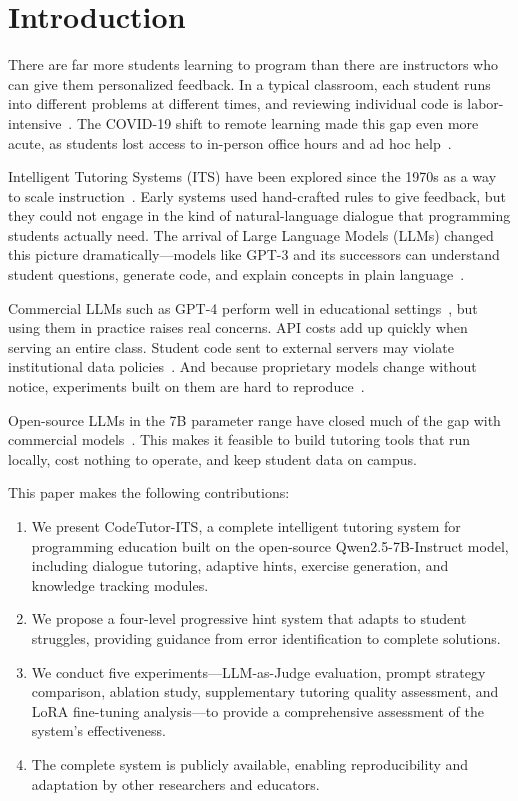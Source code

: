 \documentclass[applsci,article,submit,pdftex,moreauthors]{Definitions/mdpi}
\begin{document}
\section{Introduction}

There are far more students learning to program than there are instructors who can give them personalized feedback. In a typical classroom, each student runs into different problems at different times, and reviewing individual code is labor-intensive~\cite{ref1}. The COVID-19 shift to remote learning made this gap even more acute, as students lost access to in-person office hours and ad hoc help~\cite{ref2}.

Intelligent Tutoring Systems (ITS) have been explored since the 1970s as a way to scale instruction~\cite{ref3}. Early systems used hand-crafted rules to give feedback, but they could not engage in the kind of natural-language dialogue that programming students actually need. The arrival of Large Language Models (LLMs) changed this picture dramatically---models like GPT-3 and its successors can understand student questions, generate code, and explain concepts in plain language~\cite{ref4}.

Commercial LLMs such as GPT-4 perform well in educational settings~\cite{ref5}, but using them in practice raises real concerns. API costs add up quickly when serving an entire class. Student code sent to external servers may violate institutional data policies~\cite{ref6}. And because proprietary models change without notice, experiments built on them are hard to reproduce~\cite{ref7}.

Open-source LLMs in the 7B parameter range have closed much of the gap with commercial models~\cite{ref8}. This makes it feasible to build tutoring tools that run locally, cost nothing to operate, and keep student data on campus.

This paper makes the following contributions:
\begin{enumerate}
\item We present CodeTutor-ITS, a complete intelligent tutoring system for programming education built on the open-source Qwen2.5-7B-Instruct model, including dialogue tutoring, adaptive hints, exercise generation, and knowledge tracking modules.
\item We propose a four-level progressive hint system that adapts to student struggles, providing guidance from error identification to complete solutions.
\item We conduct five experiments---LLM-as-Judge evaluation, prompt strategy comparison, ablation study, supplementary tutoring quality assessment, and LoRA fine-tuning analysis---to provide a comprehensive assessment of the system's effectiveness.
\item The complete system is publicly available, enabling reproducibility and adaptation by other researchers and educators.
\end{enumerate}
\end{document}
